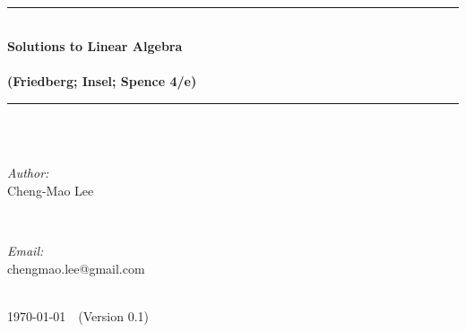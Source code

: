 \begin{titlepage}

\newcommand{\HRule}{\rule{\linewidth}{0.5mm}} %

\center %




~\\[4cm]
\HRule \\[0.4cm]
{ \huge \bfseries Solutions to Linear Algebra\\
~\\
(Friedberg; Insel; Spence 4/e) }\\[0.4cm] %
\HRule \\[1.5cm]


~\\[2cm]
\begin{minipage}{0.4\textwidth}
\begin{flushleft} \large
\emph{Author:}\\
Cheng-Mao Lee
\end{flushleft}
\end{minipage}
~
\begin{minipage}{0.4\textwidth}
\begin{flushleft} \large
\emph{Email:} \\
chengmao.lee@gmail.com
\end{flushleft}
\end{minipage}\\[6cm]



{\large \today\ \ (Version 0.1) }\\[3cm] %


\end{titlepage}
